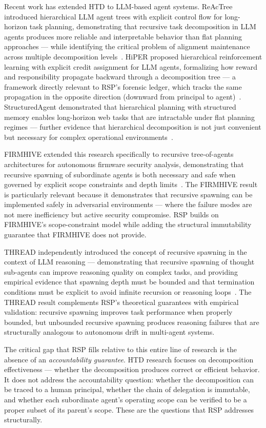 Recent work has extended HTD to LLM-based agent systems. ReAcTree introduced hierarchical LLM agent trees with explicit control flow for long-horizon task planning, demonstrating that recursive task decomposition in LLM agents produces more reliable and interpretable behavior than flat planning approaches — while identifying the critical problem of alignment maintenance across multiple decomposition levels~\citep{reactree2025}. HiPER proposed hierarchical reinforcement learning with explicit credit assignment for LLM agents, formalizing how reward and responsibility propagate backward through a decomposition tree — a framework directly relevant to RSP's forensic ledger, which tracks the same propagation in the opposite direction (downward from principal to agent)~\citep{hiper2025}. StructuredAgent demonstrated that hierarchical planning with structured memory enables long-horizon web tasks that are intractable under flat planning regimes — further evidence that hierarchical decomposition is not just convenient but necessary for complex operational environments~\citep{structuredttt2026}.

FIRMHIVE extended this research specifically to recursive tree-of-agents architectures for autonomous firmware security analysis, demonstrating that recursive spawning of subordinate agents is both necessary and safe when governed by explicit scope constraints and depth limits~\citep{firmhive2025}. The FIRMHIVE result is particularly relevant because it demonstrates that recursive spawning can be implemented safely in adversarial environments — where the failure modes are not mere inefficiency but active security compromise. RSP builds on FIRMHIVE's scope-constraint model while adding the structural immutability guarantee that FIRMHIVE does not provide.

THREAD independently introduced the concept of recursive spawning in the context of LLM reasoning — demonstrating that recursive spawning of thought sub-agents can improve reasoning quality on complex tasks, and providing empirical evidence that spawning depth must be bounded and that termination conditions must be explicit to avoid infinite recursion or reasoning loops~\citep{thread2025}. The THREAD result complements RSP's theoretical guarantees with empirical validation: recursive spawning improves task performance when properly bounded, but unbounded recursive spawning produces reasoning failures that are structurally analogous to autonomous drift in multi-agent systems.

The critical gap that RSP fills relative to this entire line of research is the absence of an \textit{accountability guarantee}. HTD research focuses on decomposition effectiveness — whether the decomposition produces correct or efficient behavior. It does not address the accountability question: whether the decomposition can be traced to a human principal, whether the chain of delegation is immutable, and whether each subordinate agent's operating scope can be verified to be a proper subset of its parent's scope. These are the questions that RSP addresses structurally.

